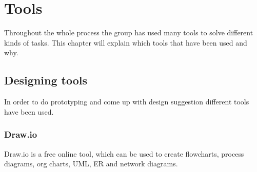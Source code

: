 \chapter{Tools}
Throughout the whole process the group has used many tools to solve different kinds of tasks. This chapter will explain which tools that have been used and why.

\section{Designing tools}
In order to do prototyping and come up with design suggestion different tools have been used.

\subsection{Draw.io}
Draw.io is a free online tool, which can be used to create flowcharts, process diagrams, org charts, UML, ER and network diagrams.\cite{drawio}

